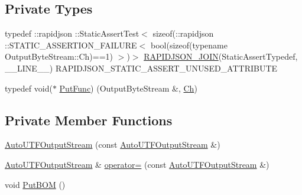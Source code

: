\subsection*{Private Types}
\begin{DoxyCompactItemize}
\item 
typedef \+::rapidjson \+::Static\+Assert\+Test$<$ sizeof(\+::rapidjson \+::S\+T\+A\+T\+I\+C\+\_\+\+A\+S\+S\+E\+R\+T\+I\+O\+N\+\_\+\+F\+A\+I\+L\+U\+RE$<$ bool(sizeof(typename Output\+Byte\+Stream\+::\+Ch)==1) $>$)$>$ \mbox{\hyperlink{classrapidjson_1_1_auto_u_t_f_output_stream_ab9516a450189bd1bde6dff768d745791}{R\+A\+P\+I\+D\+J\+S\+O\+N\+\_\+\+J\+O\+IN}}(Static\+Assert\+Typedef, \+\_\+\+\_\+\+L\+I\+N\+E\+\_\+\+\_\+) R\+A\+P\+I\+D\+J\+S\+O\+N\+\_\+\+S\+T\+A\+T\+I\+C\+\_\+\+A\+S\+S\+E\+R\+T\+\_\+\+U\+N\+U\+S\+E\+D\+\_\+\+A\+T\+T\+R\+I\+B\+U\+TE
\item 
typedef void($\ast$ \mbox{\hyperlink{classrapidjson_1_1_auto_u_t_f_output_stream_a2572eb3b4d77c0a2466ba21635ff79b5}{Put\+Func}}) (Output\+Byte\+Stream \&, \mbox{\hyperlink{classrapidjson_1_1_auto_u_t_f_output_stream_aaf40884d8f4fbf24ea040d3363c9967e}{Ch}})
\end{DoxyCompactItemize}
\subsection*{Private Member Functions}
\begin{DoxyCompactItemize}
\item 
\mbox{\hyperlink{classrapidjson_1_1_auto_u_t_f_output_stream_a34efd607e963293aa860ada21a61bf72}{Auto\+U\+T\+F\+Output\+Stream}} (const \mbox{\hyperlink{classrapidjson_1_1_auto_u_t_f_output_stream}{Auto\+U\+T\+F\+Output\+Stream}} \&)
\item 
\mbox{\hyperlink{classrapidjson_1_1_auto_u_t_f_output_stream}{Auto\+U\+T\+F\+Output\+Stream}} \& \mbox{\hyperlink{classrapidjson_1_1_auto_u_t_f_output_stream_a927efe7efab9ddc47820e4940b554d23}{operator=}} (const \mbox{\hyperlink{classrapidjson_1_1_auto_u_t_f_output_stream}{Auto\+U\+T\+F\+Output\+Stream}} \&)
\item 
void \mbox{\hyperlink{classrapidjson_1_1_auto_u_t_f_output_stream_ab52009c85bdea52aa3b09020f249fbe1}{Put\+B\+OM}} ()
\end{DoxyCompactItemize}
